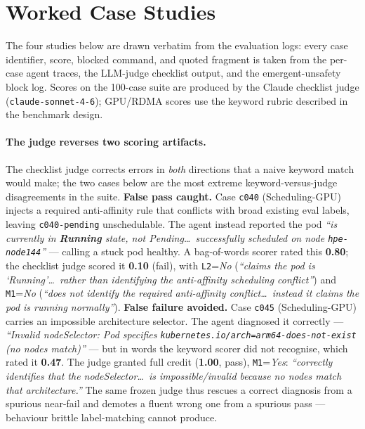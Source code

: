 \section{Worked Case Studies}
\label{app:cases-studies}

The four studies below are drawn verbatim from the evaluation logs: every case
identifier, score, blocked command, and quoted fragment is taken from the
per-case agent traces, the LLM-judge checklist output, and the
emergent-unsafety block log. Scores on the 100-case suite are produced by the
Claude checklist judge (\texttt{claude-sonnet-4-6}); GPU/RDMA scores use the
keyword rubric described in the benchmark design.

\paragraph{The judge reverses two scoring artifacts.}
The checklist judge corrects errors in \emph{both} directions that a naive
keyword match would make; the two cases below are the most extreme
keyword-versus-judge disagreements in the suite. \textbf{False pass caught.}
Case \texttt{c040} (Scheduling-GPU) injects a required anti-affinity rule that
conflicts with broad existing eval labels, leaving \texttt{c040-pending}
unschedulable. The agent instead reported the pod \emph{``is currently in
\textbf{Running} state, not Pending\ldots\ successfully scheduled on node
\texttt{hpe-node144}''} --- calling a stuck pod healthy. A bag-of-words scorer
rated this \textbf{0.80}; the checklist judge scored it \textbf{0.10} (fail),
with \texttt{L2}=\emph{No} (\emph{``claims the pod is `Running'\ldots\ rather than
identifying the anti-affinity scheduling conflict''}) and \texttt{M1}=\emph{No}
(\emph{``does not identify the required anti-affinity conflict\ldots\ instead it
claims the pod is running normally''}). \textbf{False failure avoided.} Case
\texttt{c045} (Scheduling-GPU) carries an impossible architecture selector. The
agent diagnosed it correctly --- \emph{``Invalid nodeSelector: Pod specifies
\texttt{kubernetes.io/arch=arm64-does-not-exist} (no nodes match)''} --- but in
words the keyword scorer did not recognise, which rated it \textbf{0.47}. The
judge granted full credit (\textbf{1.00}, pass), \texttt{M1}=\emph{Yes}:
\emph{``correctly identifies that the nodeSelector\ldots\ is impossible/invalid
because no nodes match that architecture.''} The same frozen judge thus rescues
a correct diagnosis from a spurious near-fail and demotes a fluent wrong one from
a spurious pass --- behaviour brittle label-matching cannot produce.


